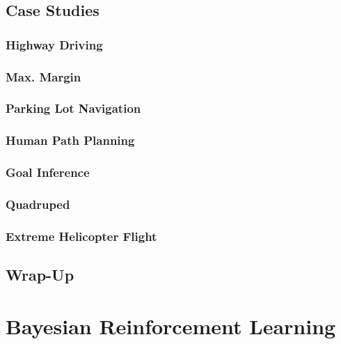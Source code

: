 	\section{Case Studies} %

		\subsection{Highway Driving} %

		\subsection{Max. Margin} %

		\subsection{Parking Lot Navigation} %

		\subsection{Human Path Planning} %

		\subsection{Goal Inference} %

		\subsection{Quadruped} %

		\subsection{Extreme Helicopter Flight} %

	\section{Wrap-Up} %

\chapter{Bayesian Reinforcement Learning} %

